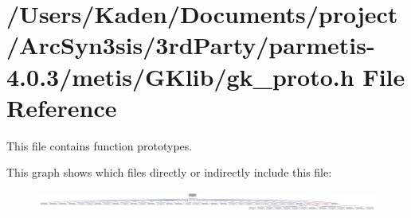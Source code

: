 \hypertarget{a00077}{}\section{/\+Users/\+Kaden/\+Documents/project/\+Arc\+Syn3sis/3rd\+Party/parmetis-\/4.0.3/metis/\+G\+Klib/gk\+\_\+proto.h File Reference}
\label{a00077}


This file contains function prototypes.  


This graph shows which files directly or indirectly include this file\+:\nopagebreak
\begin{figure}[H]
\begin{center}
\leavevmode
\includegraphics[width=350pt]{a00079}
\end{center}
\end{figure}
